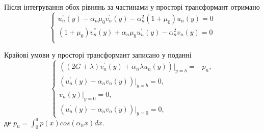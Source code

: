 Після інтегрування обох рівнянь за частинами у просторі трансформант отримано
\begin{equation}\label{transf_static_1}
    \begin{cases}
        u_n^{''}(y) - \alpha_n \mu_0 v_n^{'}(y) - \alpha_n^2 (1 + \mu_0) u_n(y) = 0 \\
        (1 + \mu_0) v_n^{''}(y) + \alpha_n \mu_0 u_n^{'}(y)  - \alpha_n^2 v_n(y) = 0 \\
    \end{cases}
\end{equation}

Крайові умови у просторі трансформант записано у поданні
\begin{equation}\label{transf_bound_static_1}
    \begin{cases}
        \left( (2G + \lambda)v_n^{'}(y) + \alpha_n \lambda u_n(y) \right)|_{y=b} = -p_n, \\
        \left(u_n^{'}(y) - \alpha_n v_n(y)  \right)|_{y=b} = 0, \\
        v_n(y)|_{y=0} = 0, \\
        \left(u_n^{'}(y) - \alpha_n v_n(y)  \right)|_{y=0} = 0,
    \end{cases}
\end{equation}
де $p_n = \int_{0}^{a} p(x) cos(\alpha_n x) dx$.

